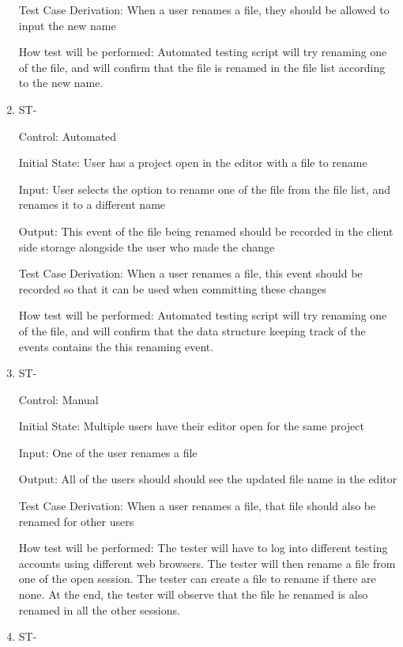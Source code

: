 \documentclass[12pt, titlepage]{article}
\newcounter{TESTID}
\newcommand\TESTNUM{\stepcounter{TESTID}\theTESTID}
\begin{document}
\begin{enumerate}
		Test Case Derivation: When a user renames a file, they should be allowed to input the new name
		
		How test will be performed: Automated testing script will try renaming one of the file, and will confirm that the file is renamed in the file list according to the new name.
		
		\item{ST-\TESTNUM\\}
		
		Control: Automated
		
		Initial State: User has a project open in the editor with a file to rename
		
		Input: User selects the option to rename one of the file from the file list, and renames it to a different name
		
		Output: This event of the file being renamed should be recorded in the client side storage alongside the user who made the change
		
		Test Case Derivation: When a user renames a file, this event should be recorded so that it can be used when committing these changes
		
		How test will be performed: Automated testing script will try renaming one of the file, and will confirm that the data structure keeping track of the events contains the this renaming event.
		
		\item{ST-\TESTNUM\\}
		
		Control: Manual
		
		Initial State: Multiple users have their editor open for the same project
		
		Input: One of the user renames a file
		
		Output: All of the users should should see the updated file name in the editor
		
		Test Case Derivation: When a user renames a file, that file should also be renamed for other users
		
		How test will be performed: The tester will have to log into different testing accounts using different web browsers. The tester will then rename a file from one of the open session. The tester can create a file to rename if there are none. At the end, the tester will observe that the file he renamed is also renamed in all the other sessions.
		
		\item{ST-\TESTNUM\\}
		

\end{enumerate}
\end{document}
